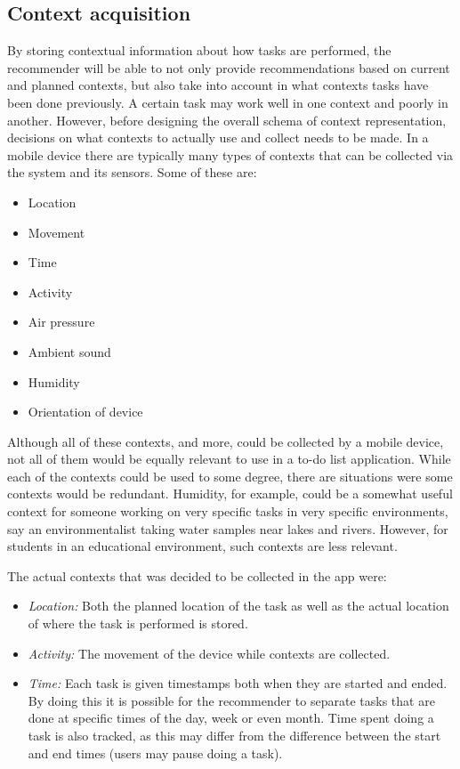 \subsection{Context acquisition}
By storing contextual information about how tasks are performed, the recommender will be able to not only provide recommendations based on current and planned contexts, but also take into account in what contexts tasks have been done previously. A certain task may work well in one context and poorly in another. However, before designing the overall schema of context representation, decisions on what contexts to actually use and collect needs to be made. In a mobile device there are typically many types of contexts that can be  collected via the system and its sensors. Some of these are:
\begin{itemize}
	\item Location
	\item Movement
	\item Time
	\item Activity
	\item Air pressure
	\item Ambient sound
	\item Humidity
	\item Orientation of device
\end{itemize}

Although all of these contexts, and more, could be collected by a mobile device, not all of them would be equally relevant to use in a to-do list application. While each of the contexts could be used to some degree, there are situations were some contexts would be redundant. Humidity, for example, could be a somewhat useful context for someone working on very specific tasks in very specific environments, say an environmentalist taking water samples near lakes and rivers. However, for students in an educational environment, such contexts are less relevant.

The actual contexts that was decided to be collected in the app were:
\begin{itemize}
	\item \emph{Location:} Both the planned location of the task as well as the actual location of where the task is performed is stored.
	\item \emph{Activity:} The movement of the device while contexts are collected.
	\item \emph{Time:} Each task is given timestamps both when they are started and ended. By doing this it is possible for the recommender to separate tasks that are done at specific times of the day, week or even month. Time spent doing a task is also tracked, as this may differ from the difference between the start and end times (users may pause doing a task).
\end{itemize}

